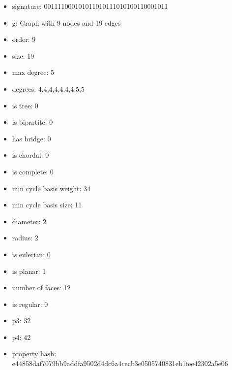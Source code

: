 \newpage
\begin{figure}
\end{figure}
\begin{itemize}
\item signature: 001111000101011010111010100110001011
\item g: Graph with 9 nodes and 19 edges
\item order: 9
\item size: 19
\item max degree: 5
\item degrees: 4,4,4,4,4,4,4,5,5
\item is tree: 0
\item is bipartite: 0
\item has bridge: 0
\item is chordal: 0
\item is complete: 0
\item min cycle basis weight: 34
\item min cycle basis size: 11
\item diameter: 2
\item radius: 2
\item is eulerian: 0
\item is planar: 1
\item number of faces: 12
\item is regular: 0
\item p3: 32
\item p4: 42
\item property hash: e44858daf7079bb9addfa9502d4dc6a4cecb3e0505740831eb1fee42302a5e06
\end{itemize}

